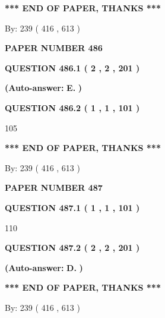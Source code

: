 \documentclass{ctexart}
\begin{document}
 
   
   
   
   
\vspace{1.0in} 
{\textbf{\large{ *** END OF PAPER, THANKS *** }}} 
   
   
\hspace{1.0in} By: 
 239 ( 416 ,  613 )
   
   
   
   
\newpage 
\setcounter{page}{ 
   486001 } 
   
   
 {\textbf{ \Large{ PAPER NUMBER  486  }}}
   
   
   
   
  
  
{\textbf{\large{QUESTION
486.1 
 ( 2 , 2 , 201 )
}}}
 
 
{\textbf{(Auto-answer:}}
{\textbf{\large{
E.}}}
{\textbf{)}}
 
 
  
  
{\textbf{\large{QUESTION
486.2 
 ( 1 , 1 , 101 )
}}}

105
   
   
   
   
\vspace{1.0in} 
{\textbf{\large{ *** END OF PAPER, THANKS *** }}} 
   
   
\hspace{1.0in} By: 
 239 ( 416 ,  613 )
   
   
   
   
\newpage 
\setcounter{page}{ 
   487001 } 
   
   
 {\textbf{ \Large{ PAPER NUMBER  487  }}}
   
   
   
   
  
  
{\textbf{\large{QUESTION
487.1 
 ( 1 , 1 , 101 )
}}}

110
  
  
{\textbf{\large{QUESTION
487.2 
 ( 2 , 2 , 201 )
}}}
 
 
{\textbf{(Auto-answer:}}
{\textbf{\large{
D.}}}
{\textbf{)}}
 
 
   
   
   
   
\vspace{1.0in} 
{\textbf{\large{ *** END OF PAPER, THANKS *** }}} 
   
   
\hspace{1.0in} By: 
 239 ( 416 ,  613 )
   
   
   
   
\newpage 
\setcounter{page}{ 
   488001 } 
   
\end{document}
